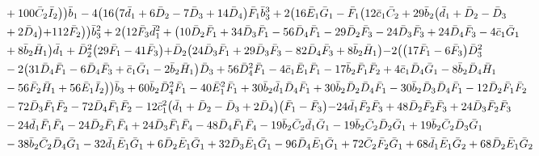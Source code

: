 \documentclass[10pt]{amsart}
\theoremstyle{definition}
\theoremstyle{corollary}
\theoremstyle{remark}
\theoremstyle{conclusion}
\begin{document}
\begin{align}
& \hskip 0.7cm+100 \bar{C}_2 \bar{I}_2\bigl)\bigl) \bar{b}_1-4 \bigl(16 \bigl(7 \bar{d}_1+6 \bar{D}_2-7 \bar{D}_3+14 \bar{D}_4\bigl) \bar{F}_1 \bar{b}_3^3+2 \bigl(16 \bar{E}_1\bar{G}_1-\bar{F}_1 \bigl(12 \bar{c}_1 \bar{C}_2+29 \bar{b}_2 \bigl(\bar{d}_1+\bar{D}_2-\bar{D}_3\nonumber \\
& \hskip 0.7cm+2 \bar{D}_4\bigl)+112 \bar{F}_2\bigl)\bigl) \bar{b}_3^2+2 \bigl(12 \bar{F}_3 \bar{d}_1^2+\bigl(10 \bar{D}_2 \bar{F}_1+34 \bar{D}_3 \bar{F}_1-56 \bar{D}_4 \bar{F}_1-29 \bar{D}_2 \bar{F}_3-24 \bar{D}_3 \bar{F}_3+24 \bar{D}_4 \bar{F}_3-4 \bar{c}_1\bar{G}_1\nonumber \\
& \hskip 0.7cm+8 \bar{b}_2 \bar{H}_1\bigl) \bar{d}_1+\bar{D}_2^2 \bigl(29 \bar{F}_1-41 \bar{F}_3\bigl)+\bar{D}_2 \bigl(24 \bar{D}_3 \bar{F}_1+29 \bar{D}_3 \bar{F}_3-82 \bar{D}_4 \bar{F}_3+8 \bar{b}_2 \bar{H}_1\bigl)-2 \bigl(\bigl(17 \bar{F}_1-6 \bar{F}_3\bigl) \bar{D}_3^2\nonumber \\
& \hskip 0.7cm-2 \bigl(31 \bar{D}_4 \bar{F}_1-6 \bar{D}_4 \bar{F}_3+\bar{c}_1 \bar{G}_1-2 \bar{b}_2 \bar{H}_1\bigl) \bar{D}_3+56 \bar{D}_4^2 \bar{F}_1-4 \bar{c}_1 \bar{E}_1 \bar{F}_1-17 \bar{b}_2 \bar{F}_1 \bar{F}_2+4 \bar{c}_1 \bar{D}_4 \bar{G}_1-8 \bar{b}_2 \bar{D}_4 \bar{H}_1\nonumber\\
& \hskip 0.7cm -56 \bar{F}_2 \bar{H}_1+56 \bar{E}_1 \bar{I}_2\bigl)\bigl) \bar{b}_3+60 \bar{b}_2 \bar{D}_4^2 \bar{F}_1-40 \bar{E}_1^2 \bar{F}_1+30 \bar{b}_2 \bar{d}_1 \bar{D}_4 \bar{F}_1+30 \bar{b}_2 \bar{D}_2 \bar{D}_4 \bar{F}_1-30 \bar{b}_2 \bar{D}_3 \bar{D}_4 \bar{F}_1-12 \bar{D}_2 \bar{F}_1 \bar{F}_2\nonumber \\
& \hskip 0.7cm-72 \bar{D}_3 \bar{F}_1 \bar{F}_2-72 \bar{D}_4 \bar{F}_1 \bar{F}_2-12 \bar{c}_1^2 \bigl(\bar{d}_1+\bar{D}_2-\bar{D}_3+2 \bar{D}_4\bigl) \bigl(\bar{F}_1-\bar{F}_3\bigl)-24 \bar{d}_1 \bar{F}_2 \bar{F}_3+48 \bar{D}_2 \bar{F}_2 \bar{F}_3+24 \bar{D}_3 \bar{F}_2\bar{F}_3\nonumber \\
& \hskip 0.7cm-24 \bar{d}_1 \bar{F}_1 \bar{F}_4-24 \bar{D}_2 \bar{F}_1 \bar{F}_4+24 \bar{D}_3 \bar{F}_1 \bar{F}_4-48 \bar{D}_4 \bar{F}_1 \bar{F}_4-19 \bar{b}_2 \bar{C}_2 \bar{d}_1 \bar{G}_1-19 \bar{b}_2 \bar{C}_2 \bar{D}_2 \bar{G}_1+19 \bar{b}_2 \bar{C}_2 \bar{D}_3 \bar{G}_1\nonumber \\
& \hskip 0.7cm-38 \bar{b}_2 \bar{C}_2 \bar{D}_4 \bar{G}_1-32 \bar{d}_1 \bar{E}_1 \bar{G}_1+6 \bar{D}_2 \bar{E}_1 \bar{G}_1+32 \bar{D}_3 \bar{E}_1 \bar{G}_1-96 \bar{D}_4 \bar{E}_1 \bar{G}_1+72 \bar{C}_2 \bar{F}_2 \bar{G}_1+68 \bar{d}_1 \bar{E}_1 \bar{G}_2+68 \bar{D}_2 \bar{E}_1 \bar{G}_2\nonumber \\

\end{align}
\end{document}
